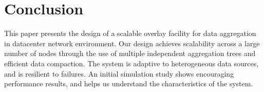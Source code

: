 \section{Conclusion}\label{sec:conclusion}

This paper presents the design of a scalable overlay facility for data
aggregation in datacenter network environment.  Our design achieves scalability
across a large number of nodes through the use of multiple independent
aggregation trees and efficient data compaction.  The system is adaptive to
heterogeneous data sources, and is resilient to failures.  An initial
simulation study shows encouraging performance results, and helps us understand
the characteristics of the system.
